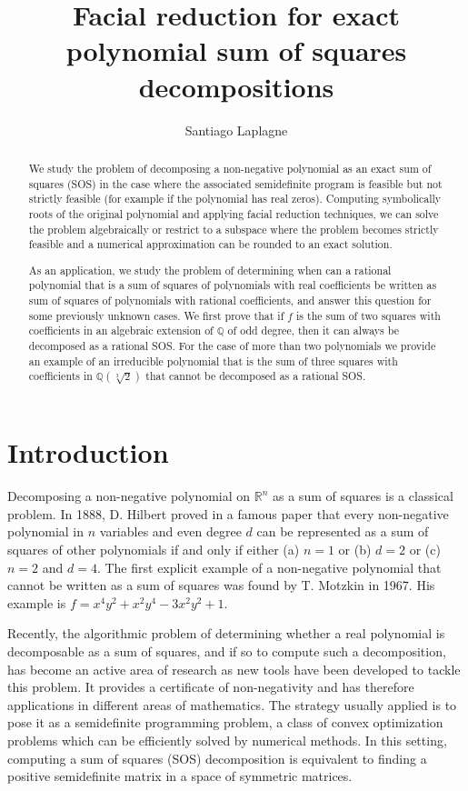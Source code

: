\documentclass{amsart}
\title{Facial reduction for exact polynomial sum of squares decompositions}
\author{Santiago Laplagne}
\theoremstyle{definition}
\theoremstyle{remark}
\numberwithin{equation}{section}
\newcommand{\Q}{{\mathbb Q}}
\newcommand{\R}{{\mathbb R}}
\begin{document}
\begin{abstract}
We study the problem of decomposing a non-negative polynomial as an exact sum of squares (SOS) in the case where
the associated semidefinite program is feasible but not strictly feasible (for example if the polynomial has real zeros). Computing symbolically roots of the original polynomial and applying facial reduction techniques, we can solve the problem algebraically or restrict to a subspace where the problem becomes strictly feasible and a numerical approximation can be rounded to an exact solution.

As an application, we study the problem of determining when can a rational polynomial that is a sum of squares of polynomials with real coefficients be written as sum of squares of polynomials with rational coefficients, and answer this question for some previously unknown cases. We first prove that if $f$ is the sum of two squares with coefficients in an algebraic extension of $\Q$ of odd degree, then it can always be decomposed as a rational SOS. For the case of more than two polynomials we provide an example of an irreducible polynomial that is the sum of three squares with coefficients in $\Q(\sqrt[3]{2})$ that cannot be decomposed as a rational SOS.
\end{abstract}
\maketitle

\section{Introduction} \label{secIntro}
Decomposing a non-negative polynomial on $\R^n$ as a sum of squares is a classical problem.
In 1888, D. Hilbert proved in a famous paper \cite{Hilbert} that every non-negative polynomial in $n$ variables and even degree $d$ can be represented as a sum of squares of other polynomials if and only if either (a) $n = 1$ or (b) $d = 2$ or (c) $n = 2$ and $d = 4$. The first explicit example of a non-negative polynomial that cannot be written as a sum of squares was found by T. Motzkin \cite{Motzkin} in 1967. His example is $f = x^4y^2 + x^2y^4 - 3x^2y^2 + 1$.

Recently, the algorithmic problem of determining whether a real polynomial is decomposable as a sum of squares, and if so to compute such a decomposition, has become an active area of research as new tools have been developed to tackle this problem. It provides a certificate of non-negativity and has therefore applications in different areas of mathematics. The strategy usually applied is to pose it as a semidefinite programming problem, a class of convex optimization problems which can be efficiently solved by numerical methods. In this setting, computing a sum of squares (SOS) decomposition is equivalent to finding a positive semidefinite matrix in a space of symmetric matrices.
\end{document}
